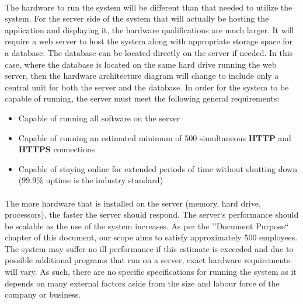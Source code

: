 \documentclass[letterpaper,12pt]{report}
\begin{document}
\paragraph*{}\hspace{0.6cm}The hardware to run the system will be different than that needed to utilize the system. For the server side of the system that will actually be hosting the application and displaying it, the hardware qualifications are much larger. It will require a web server to host the system along with appropriate storage space for a database. The database can be located directly on the server if needed. In this case, where the database is located on the same hard drive running the web server, then the hardware architecture diagram will change to include only a central unit for both the server and the database. In order for the system to be capable of running, the server must meet the following general requirements:
\begin{itemize}
 \item Capable of running all software on the server
 \item Capable of running an estimated minimum of 500 simultaneous \textbf{HTTP} and \textbf{HTTPS} connections
 \item Capable of staying online for extended periods of time without shutting down (99.9\% uptime is the industry standard)
\end{itemize}

\paragraph*{}\hspace{0.6cm}The more hardware that is installed on the server (memory, hard drive, processors), the faster the server should respond. The server`s performance should be scalable as the use of the system increases. As per the ''Document Purpose`` chapter of this document, our scope aims to satisfy approximately 500 employees. The system may suffer no ill performance if this estimate is exceeded and due to possible additional programs that run on a server, exact hardware requirements will vary. As such, there are no specific specifications for running the system as it depends on many external factors aside from the size and labour force of the company or business.
\end{document}
